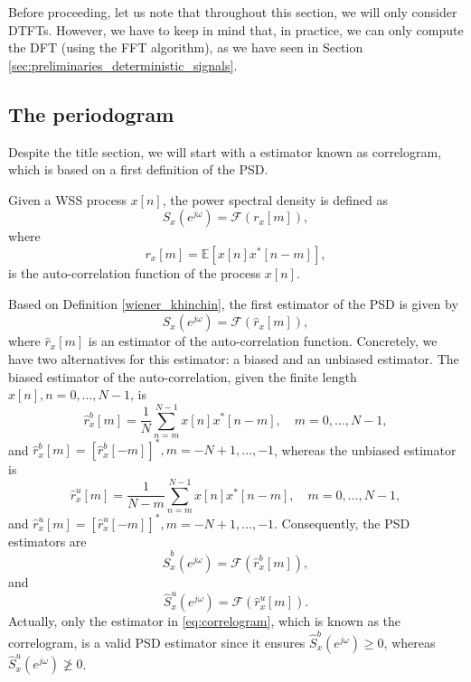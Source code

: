 Before proceeding, let us note that throughout this section, we will only consider DTFTs. However, we have to keep in mind that, in practice, we can only compute the DFT (using the FFT algorithm), as we have seen in Section \ref{sec:preliminaries_deterministic_signals}.

\subsection{The periodogram}

Despite the title section, we will start with a estimator known as correlogram, which is based on a first definition of the PSD.
\begin{definition}
	\label{wiener_khinchin}
	Given a WSS process $x[n]$, the power spectral density is defined as
	\begin{equation}
	S_x(e^{j \omega}) = \mathcal{F}(r_{x}[m]),
	\end{equation}
	where
	\begin{equation}
	r_{x}[m] = \mathbb{E}[x[n] x^{\ast}[n-m]],
	\end{equation}
	is the auto-correlation function of the process $x[n]$.
\end{definition}

Based on Definition \ref{wiener_khinchin}, the first estimator of the PSD is given by
\begin{equation}
	\hat{S}_x(e^{j \omega}) = \mathcal{F}(\hat{r}_{x}[m]),
\end{equation}
where $\hat{r}_{x}[m]$ is an estimator of the auto-correlation function. Concretely, we have two alternatives for this estimator: a biased and an unbiased estimator. The biased estimator of the auto-correlation, given the finite length $x[n], n = 0, \ldots, N-1$, is
\begin{equation}
	\label{eq:autocorrelation_biased}
	\hat{r}_{x}^{b}[m] = \frac{1}{N} \sum_{n = m}^{N-1} x[n] x^{\ast}[n-m], \quad m = 0, \ldots, N-1,
\end{equation}
and $\hat{r}_{x}^{b}[m] = \left[ \hat{r}_{x}^{b}[-m] \right]^{\ast}, m = -N+1, \ldots, -1$, whereas the unbiased estimator is
\begin{equation}
	\label{eq:autocorrelation_unbiased}
\hat{r}_{x}^{u}[m] = \frac{1}{N-m} \sum_{n = m}^{N-1} x[n] x^{\ast}[n-m], \quad m = 0, \ldots, N-1,
\end{equation}
and $\hat{r}_{x}^{u}[m] = \left[ \hat{r}_{x}^{u}[-m] \right]^{\ast}, m = -N+1, \ldots, -1$. Consequently, the PSD estimators are
\begin{equation}
\label{eq:correlogram}
\hat{S}_x^{b}(e^{j \omega}) = \mathcal{F}(\hat{r}_{x}^{b}[m]),
\end{equation}
and
\begin{equation}
\hat{S}_x^{u}(e^{j \omega}) = \mathcal{F}(\hat{r}_{x}^{u}[m]).
\end{equation}
Actually, only the estimator in \eqref{eq:correlogram}, which is known as the correlogram, is a valid PSD estimator since it ensures $\hat{S}_x^{b}(e^{j \omega}) \geq 0$, whereas $\hat{S}_x^{u}(e^{j \omega}) \not \geq 0$.

